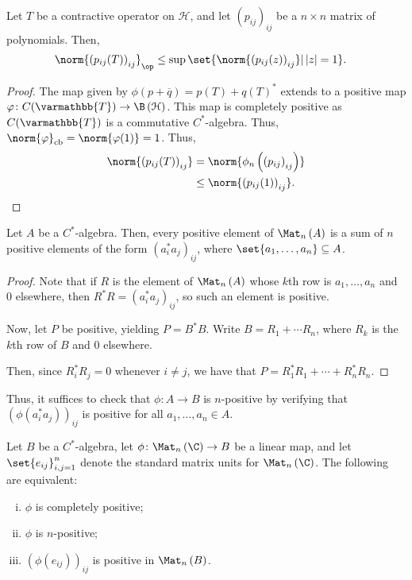 \documentclass[10pt]{mypackage}
\renewcommand*{\mathbb}[1]{\varmathbb{#1}}
\DeclareMathOperator{\cb}{cb}
\begin{document}
\begin{corollary}
  Let $T$ be a contractive operator on $\mathcal{H}$, and let $\left( p_{ij} \right)_{ij}$ be a $n\times n$ matrix of polynomials. Then,
  \begin{align*}
    \norm{\left( p_{ij}(T) \right)_{ij}}_{\op} &\leq \sup\set{\norm{\left( p_{ij}(z) \right)_{ij}} | \left\vert z \right\vert = 1}.
  \end{align*}
\end{corollary}
\begin{proof}
  The map given by $\phi\left( p + \overline{q} \right) = p(T) + q(T)^{\ast}$ extends to a positive map $\varphi\colon C(\mathbb{T})\rightarrow \B\left( \mathcal{H} \right)$. This map is completely positive as $C(\mathbb{T})$ is a commutative $C^{\ast}$-algebra. Thus, $\norm{\varphi}_{\cb} = \norm{\varphi(1)} = 1$. Thus,
  \begin{align*}
    \norm{\left( p_{ij}(T) \right)_{ij}} &= \norm{\phi_n\left( \left( p_{ij} \right)_{ij} \right)}\\
                                         &\leq \norm{\left( p_{ij}(1) \right)_{ij}}.
  \end{align*}
\end{proof}
\begin{lemma}
  Let $A$ be a $C^{\ast}$-algebra. Then, every positive element of $\Mat_n\left( A \right)$ is a sum of $n$ positive elements of the form $\left( a_i^{\ast}a_j \right)_{ij}$, where $\set{a_1,\dots,a_n}\subseteq A$.
\end{lemma}
\begin{proof}
  Note that if $R$ is the element of $\Mat_n\left( A \right)$ whose $k$th row is $a_1,\dots,a_n$ and $0$ elsewhere, then $R^{\ast}R = \left( a_i^{\ast}a_j \right)_{ij}$, so such an element is positive.\newline

  Now, let $P$ be positive, yielding $P = B^{\ast}B$. Write $B = R_1 + \cdots R_n$, where $R_k$ is the $k$th row of $B$ and $0$ elsewhere.\newline

  Then, since $R_i^{\ast}R_j = 0$ whenever $i\neq j$, we have that $P = R_1^{\ast}R_1 + \cdots + R_n^{\ast}R_n$.
\end{proof}
Thus, it suffices to check that $\phi\colon A\rightarrow B$ is $n$-positive by verifying that $\left( \phi\left( a_i^{\ast}a_j \right) \right)_{ij}$ is positive for all $a_1,\dots,a_n\in A$.
\begin{theorem}
  Let $B$ be a $C^{\ast}$-algebra, let $\phi\colon \Mat_n\left( \C \right)\rightarrow B$ be a linear map, and let $\set{e_{ij}}_{i,j=1}^{n}$ denote the standard matrix units for $\Mat_n\left( \C \right)$. The following are equivalent:
  \begin{enumerate}[(i)]
    \item $\phi$ is completely positive;
    \item $\phi$ is $n$-positive;
    \item $\left( \phi\left( e_{ij} \right) \right)_{ij}$ is positive in $\Mat_n\left( B \right)$.
  \end{enumerate}
\end{theorem}
\end{document}
